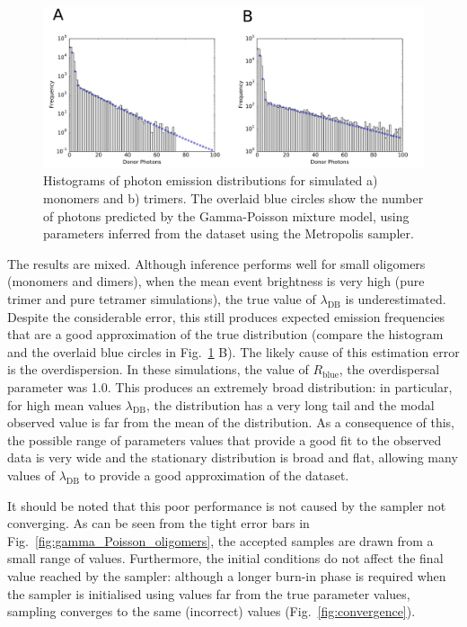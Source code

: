 \begin{figure}
   \begin{center}
      \includegraphics*[clip=true, width=6in]{sizing/oligomer_marginals.pdf}
      \caption{Histograms of photon emission distributions for simulated a) monomers and b) trimers. The overlaid blue circles show the  number of photons predicted by the Gamma-Poisson mixture model, using parameters inferred from the dataset using the Metropolis sampler.}
      \label{fig:hist_fit_trimer}
   \end{center}
\end{figure}

The results are mixed. Although inference performs well for small oligomers (monomers and dimers), when the mean event brightness is very high (pure trimer and pure tetramer simulations), the true value of $\lambda_{\text{DB}}$ is underestimated. Despite the considerable error, this still produces expected emission frequencies that are a good approximation of the true distribution (compare the histogram and the overlaid blue circles in Fig.~\ref{fig:hist_fit_trimer} B). The likely cause of this estimation error is the overdispersion. In these simulations, the value of $R_{\text{blue}}$, the overdispersal parameter was 1.0. This produces an extremely broad distribution: in particular, for high mean values $\lambda_{\text{DB}}$, the distribution has a very long tail and the modal observed value is far from the mean of the distribution. As a consequence of this, the possible range of parameters values that provide a good fit to the observed data is very wide and the stationary distribution is broad and flat, allowing many values of $\lambda_{\text{DB}}$ to provide a good approximation of the dataset.

It should be noted that this poor performance is not caused by the sampler not converging. As can be seen from the tight error bars in Fig.~\ref{fig:gamma_Poisson_oligomers}, the accepted samples are drawn from a small range of values. Furthermore, the initial conditions do not affect the final value reached by the sampler: although a longer burn-in phase is required when the sampler is initialised using values far from the true parameter values, sampling converges to the same (incorrect) values (Fig.~\ref{fig:convergence}).

